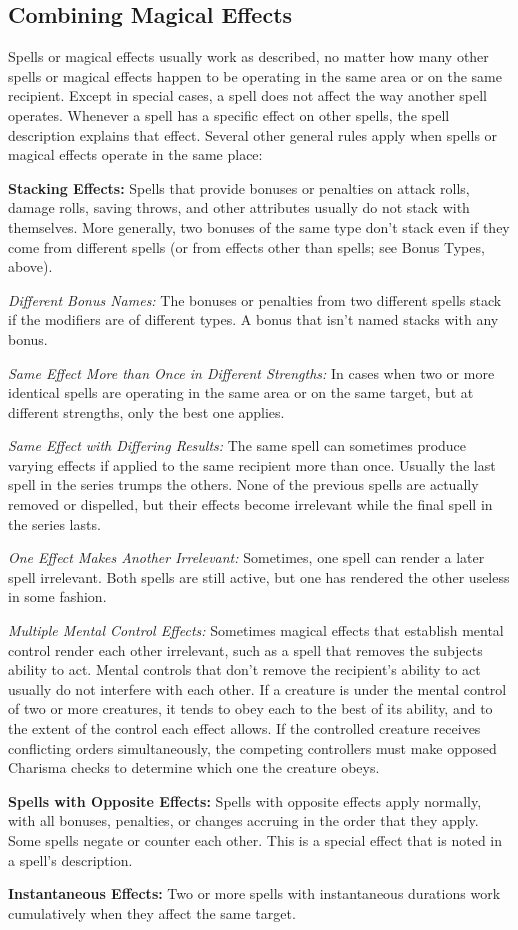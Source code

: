 \subsection{Combining Magical Effects}
Spells or magical effects usually work as described, no matter how many other spells or magical effects happen to be operating in the same area or on the same recipient. Except in special cases, a spell does not affect the way another spell operates. Whenever a spell has a specific effect on other spells, the spell description explains that effect. Several other general rules apply when spells or magical effects operate in the same place:

\textbf{Stacking Effects:} Spells that provide bonuses or penalties on attack rolls, damage rolls, saving throws, and other attributes usually do not stack with themselves. More generally, two bonuses of the same type don't stack even if they come from different spells (or from effects other than spells; see Bonus Types, above).

\textit{Different Bonus Names:} The bonuses or penalties from two different spells stack if the modifiers are of different types. A bonus that isn't named stacks with any bonus.

\textit{Same Effect More than Once in Different Strengths:} In cases when two or more identical spells are operating in the same area or on the same target, but at different strengths, only the best one applies.

\textit{Same Effect with Differing Results:} The same spell can sometimes produce varying effects if applied to the same recipient more than once. Usually the last spell in the series trumps the others. None of the previous spells are actually removed or dispelled, but their effects become irrelevant while the final spell in the series lasts.

\textit{One Effect Makes Another Irrelevant:} Sometimes, one spell can render a later spell irrelevant. Both spells are still active, but one has rendered the other useless in some fashion.

\textit{Multiple Mental Control Effects:} Sometimes magical effects that establish mental control render each other irrelevant, such as a spell that removes the subjects ability to act. Mental controls that don't remove the recipient's ability to act usually do not interfere with each other. If a creature is under the mental control of two or more creatures, it tends to obey each to the best of its ability, and to the extent of the control each effect allows. If the controlled creature receives conflicting orders simultaneously, the competing controllers must make opposed Charisma checks to determine which one the creature obeys.

\textbf{Spells with Opposite Effects:} Spells with opposite effects apply normally, with all bonuses, penalties, or changes accruing in the order that they apply. Some spells negate or counter each other. This is a special effect that is noted in a spell's description.

\textbf{Instantaneous Effects:} Two or more spells with instantaneous durations work cumulatively when they affect the same target.